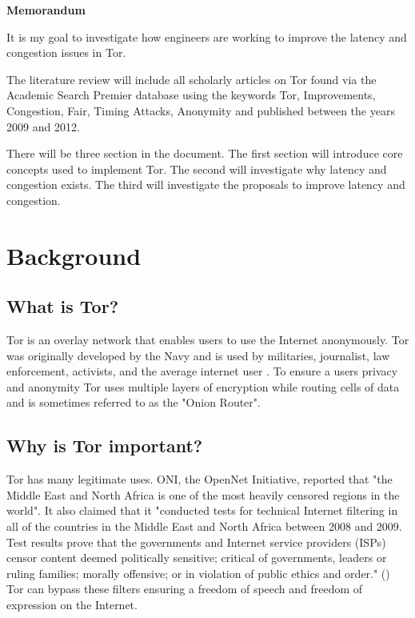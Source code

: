 \documentclass[letterpaper,12pt]{texMemo}
\begin{document}
\singlespace
\begin{center}
\large {\bf Memorandum}
\end{center}
\setlength{\topmargin}{0in}
\maketitle

It is my goal to investigate how engineers are working to improve the latency and congestion issues in Tor.

The literature review will include all scholarly articles on Tor found via the Academic Search
Premier database using the keywords Tor, Improvements, Congestion, Fair, Timing Attacks,
Anonymity and published between the years 2009 and 2012.

There will be three section in the document. The first section will introduce core concepts used to
implement Tor. The second will investigate why latency and congestion exists. The third will
investigate the proposals to improve latency and congestion.

\section*{Background}

    \subsection*{What is Tor?}
    Tor is an overlay network that enables users to use the Internet anonymously. Tor was originally
    developed by the Navy and is used by militaries, journalist, law enforcement, activists, and the
    average internet user \citep[2]{Tor:web}. To ensure a users privacy and anonymity Tor uses multiple
    layers of encryption while routing cells of data and is sometimes referred to as the "Onion Router".

    \subsection*{Why is Tor important?}
    Tor has many legitimate uses. ONI, the OpenNet Initiative, reported that "the Middle East and
    North Africa is one of the most heavily censored regions in the world". It also claimed that it
    "conducted tests for technical Internet filtering in all of the countries in the Middle East
    and North Africa between 2008 and 2009. Test results prove that the governments and Internet
    service providers (ISPs) censor content deemed politically sensitive; critical of governments,
    leaders or ruling families; morally offensive; or in violation of public ethics and order." (\citeauthor[6]{ONI}) Tor
    can bypass these filters ensuring a freedom of speech and freedom of expression on the Internet.
\end{document}
